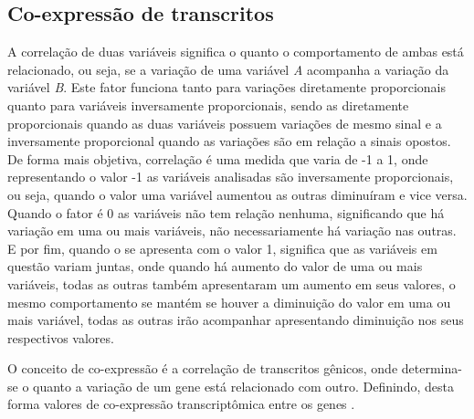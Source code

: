 
\subsection{Co-expressão de transcritos}

A correlação de duas variáveis significa o quanto o comportamento de ambas está relacionado, ou seja, se a variação de uma variável \textsl{A} acompanha a variação da variável \textsl{B}. Este fator funciona tanto para variações diretamente proporcionais quanto para variáveis inversamente proporcionais, sendo as diretamente proporcionais quando as duas variáveis possuem variações de mesmo sinal e a inversamente proporcional quando as variações são em relação a sinais opostos.
De forma mais objetiva, correlação é uma medida que varia de -1 a 1, onde representando o valor -1 as variáveis analisadas são inversamente proporcionais, ou seja, quando o valor uma variável aumentou as outras diminuíram e vice versa. Quando o fator é 0 as variáveis não tem relação nenhuma, significando que há variação em uma ou mais variáveis, não necessariamente há variação nas outras. E por fim, quando o se apresenta com o valor 1, significa que as variáveis em questão variam juntas, onde quando há aumento do valor de uma ou mais variáveis, todas as outras também apresentaram um aumento em seus valores, o mesmo comportamento se mantém se houver a diminuição do valor em uma ou mais variável, todas as outras irão acompanhar apresentando diminuição nos seus respectivos valores.

O conceito de co-expressão é a correlação de transcritos gênicos, onde determina-se o quanto a variação de um gene está relacionado com outro. Definindo, desta forma valores de co-expressão transcriptômica entre os genes
\cite{Gaiteri2014}.






